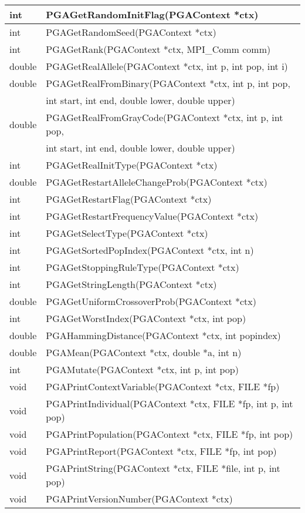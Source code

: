 \documentclass{report}
\begin{document}
\begin{tabular}{|l|l|}
int &  PGAGetRandomInitFlag(PGAContext *ctx) \\ \hline
int &  PGAGetRandomSeed(PGAContext *ctx) \\ \hline
int &  PGAGetRank(PGAContext *ctx, MPI\_Comm comm) \\ \hline
double &  PGAGetRealAllele(PGAContext *ctx, int p, int pop, int i) \\ \hline
double &  PGAGetRealFromBinary(PGAContext *ctx, int p, int pop, \\
       &  int start, int end, double lower, double upper) \\ \hline
double &  PGAGetRealFromGrayCode(PGAContext *ctx, int p, int pop, \\
       &  int start, int end, double lower, double upper) \\ \hline
int &  PGAGetRealInitType(PGAContext *ctx) \\ \hline
double &  PGAGetRestartAlleleChangeProb(PGAContext *ctx) \\ \hline
int &  PGAGetRestartFlag(PGAContext *ctx) \\ \hline
int &  PGAGetRestartFrequencyValue(PGAContext *ctx) \\ \hline
int &  PGAGetSelectType(PGAContext *ctx) \\ \hline
int &  PGAGetSortedPopIndex(PGAContext *ctx, int n) \\ \hline
int &  PGAGetStoppingRuleType(PGAContext *ctx) \\ \hline
int &  PGAGetStringLength(PGAContext *ctx) \\ \hline
double &  PGAGetUniformCrossoverProb(PGAContext *ctx) \\ \hline
int &  PGAGetWorstIndex(PGAContext *ctx, int pop) \\ \hline
double &  PGAHammingDistance(PGAContext *ctx, int popindex) \\ \hline
double &  PGAMean(PGAContext *ctx, double *a, int n) \\ \hline
int &  PGAMutate(PGAContext *ctx, int p, int pop) \\ \hline
void &  PGAPrintContextVariable(PGAContext *ctx, FILE *fp) \\ \hline
void &  PGAPrintIndividual(PGAContext *ctx, FILE *fp, int p, int pop) \\ \hline
void &  PGAPrintPopulation(PGAContext *ctx, FILE *fp, int pop) \\ \hline
void &  PGAPrintReport(PGAContext *ctx, FILE *fp, int pop) \\ \hline
void &  PGAPrintString(PGAContext *ctx, FILE *file, int p, int pop) \\ \hline
void &  PGAPrintVersionNumber(PGAContext *ctx) \\ \hline
\end{tabular}
\end{document}
